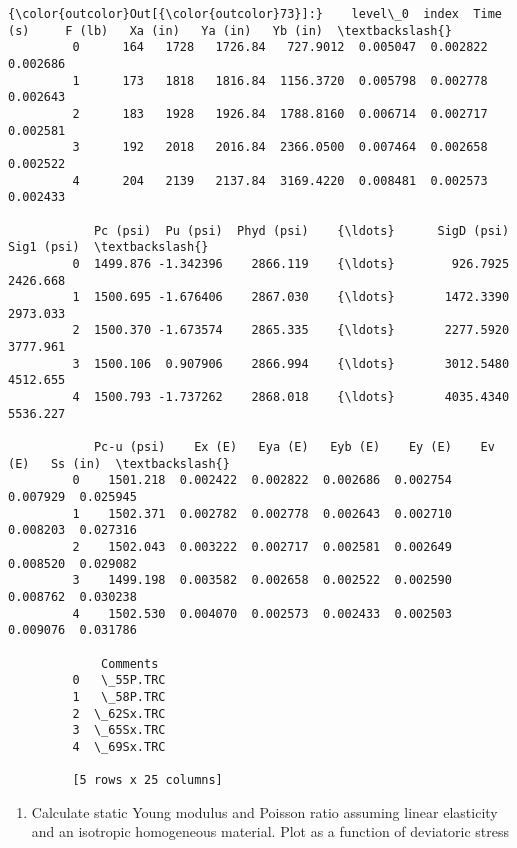 \documentclass[11pt]{article}
\providecommand{\tightlist}{%
      \setlength{\itemsep}{0pt}\setlength{\parskip}{0pt}}
\begin{document}
\begin{Verbatim}[commandchars=\\\{\}]
{\color{outcolor}Out[{\color{outcolor}73}]:}    level\_0  index  Time (s)     F (lb)   Xa (in)   Ya (in)   Yb (in)  \textbackslash{}
         0      164   1728   1726.84   727.9012  0.005047  0.002822  0.002686   
         1      173   1818   1816.84  1156.3720  0.005798  0.002778  0.002643   
         2      183   1928   1926.84  1788.8160  0.006714  0.002717  0.002581   
         3      192   2018   2016.84  2366.0500  0.007464  0.002658  0.002522   
         4      204   2139   2137.84  3169.4220  0.008481  0.002573  0.002433   
         
            Pc (psi)  Pu (psi)  Phyd (psi)    {\ldots}      SigD (psi)  Sig1 (psi)  \textbackslash{}
         0  1499.876 -1.342396    2866.119    {\ldots}        926.7925    2426.668   
         1  1500.695 -1.676406    2867.030    {\ldots}       1472.3390    2973.033   
         2  1500.370 -1.673574    2865.335    {\ldots}       2277.5920    3777.961   
         3  1500.106  0.907906    2866.994    {\ldots}       3012.5480    4512.655   
         4  1500.793 -1.737262    2868.018    {\ldots}       4035.4340    5536.227   
         
            Pc-u (psi)    Ex (E)   Eya (E)   Eyb (E)    Ey (E)    Ev (E)   Ss (in)  \textbackslash{}
         0    1501.218  0.002422  0.002822  0.002686  0.002754  0.007929  0.025945   
         1    1502.371  0.002782  0.002778  0.002643  0.002710  0.008203  0.027316   
         2    1502.043  0.003222  0.002717  0.002581  0.002649  0.008520  0.029082   
         3    1499.198  0.003582  0.002658  0.002522  0.002590  0.008762  0.030238   
         4    1502.530  0.004070  0.002573  0.002433  0.002503  0.009076  0.031786   
         
             Comments  
         0   \_55P.TRC  
         1   \_58P.TRC  
         2  \_62Sx.TRC  
         3  \_65Sx.TRC  
         4  \_69Sx.TRC  
         
         [5 rows x 25 columns]
\end{Verbatim}
            
    \begin{enumerate}
\def\labelenumi{\arabic{enumi}.}
\tightlist
\item
  Calculate static Young modulus and Poisson ratio assuming linear
  elasticity and an isotropic homogeneous material. Plot as a function
  of deviatoric stress
\end{enumerate}
\end{document}
